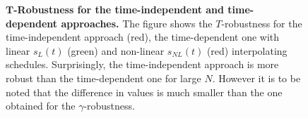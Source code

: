 \begin{figure}[ht]
  \centering
  \caption{\textbf{$\bm{T}$-Robustness for the time-independent and time-dependent approaches.} The figure shows the $T$-robustness  for the time-independent approach (red), the time-dependent one with linear $s_L(t)$ (green) and non-linear $s_{NL}(t)$ (red) interpolating schedules. Surprisingly, the time-independent approach is more robust than the time-dependent one for large $N$. However it is to be noted that the difference in values is much smaller than the one obtained for the $\gamma$-robustness.}
  \label{fig:time_robustness}
\end{figure}
